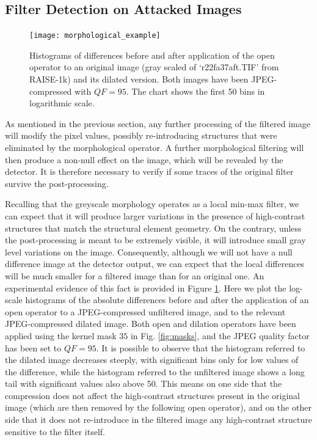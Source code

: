 \documentclass[review]{elsarticle}
\begin{document}
\subsection{Filter Detection on Attacked Images}
\label{subsec:compr_img}
\begin{figure}[!ht]%
	\centering
	\texttt{[image: morphological\_example]}
	\caption{Histograms of differences before and after application of the open operator to an original image (gray scaled of `r22fa37aft.TIF' from RAISE-1k) and its dilated version. Both images have been JPEG-compressed with $QF = 95$. The chart shows the first 50 bins in logarithmic scale. }
	\label{fig:hist_ero}
\end{figure}

As mentioned in the previous section, any further processing of the filtered image will modify the pixel values, possibly re-introducing structures that were eliminated by the morphological operator. A further morphological filtering will then produce a non-null effect on the image, which will be revealed by the detector. It is therefore necessary to verify if some traces of the original filter survive the post-processing.

Recalling that the greyscale morphology operates as a local min-max filter, we can expect that it will produce larger variations in the presence of high-contrast structures that match the structural element geometry. On the contrary, unless the post-processing is meant to be extremely visible, it will introduce small gray level variations on the image. Consequently, although we will not have a null difference image at the detector output, we can expect that the local differences will be much smaller for a filtered image than for an original one. An experimental evidence of this fact is provided in Figure \ref{fig:hist_ero}. Here we plot the log-scale histograms of the absolute differences before and after the application of an open operator to a JPEG-compressed unfiltered image, and to the relevant JPEG-compressed dilated image. Both open and dilation operators have been applied using the kernel mask $35$ in Fig. \ref{fig:masks}, and the JPEG quality factor has been set to $QF=95$. It is possible to observe that the histogram referred to the dilated image decreases steeply, with significant bins only for low values of the difference, while the histogram referred to the unfiltered image shows a long tail with significant values also above 50. This means on one side that the compression does not affect the high-contrast structures present in the original image (which are then removed by the following open operator), and on the other side that it does not re-introduce in the filtered image any high-contrast structure sensitive to the filter itself.
\end{document}
